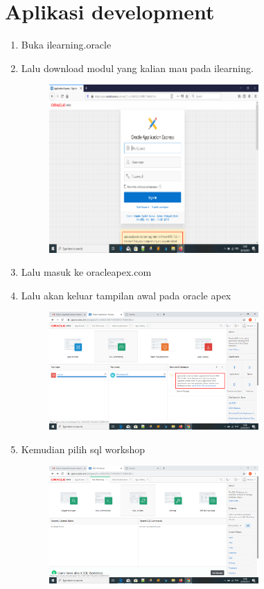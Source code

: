 \documentclass{article}
\begin{document}
\section{Aplikasi development}
\begin{enumerate}

\item Buka ilearning.oracle

 
\item Lalu download modul yang kalian mau pada ilearning.
\begin{figure}[h]
\centerline{\includegraphics[width=8cm]{figure/B.png}}
            \end{figure}
\item Lalu masuk ke oracleapex.com

 
\newpage\item Lalu akan keluar tampilan awal pada oracle apex
\begin{figure}[h]
\centerline{\includegraphics[width=8cm]{figure/C.png}}
            \end{figure}
 
\item  Kemudian pilih sql workshop
\begin{figure}[h]
\centerline{\includegraphics[width=8cm]{figure/D.png}}
            \end{figure}
 

\end{enumerate}
\end{document}
